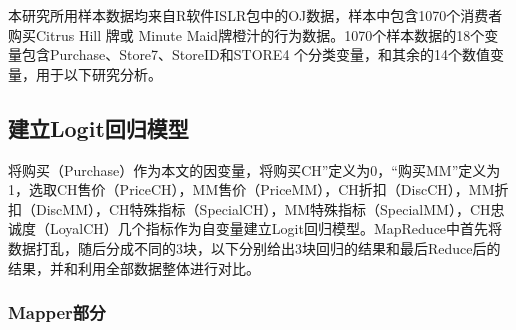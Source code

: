 本研究所用样本数据均来自R软件ISLR包中的OJ数据，样本中包含1070个消费者购买Citrus
Hill 牌或 Minute
Maid牌橙汁的行为数据。1070个样本数据的18个变量包含Purchase、Store7、StoreID和STORE4
个分类变量，和其余的14个数值变量，用于以下研究分析。

\subsection{建立Logit回归模型}\label{ux5efaux7acblogitux56deux5f52ux6a21ux578b}

将购买（Purchase）作为本文的因变量，将购买CH''定义为0，``购买MM''定义为1，选取CH售价（PriceCH），MM售价（PriceMM），CH折扣（DiscCH），MM折扣（DiscMM），CH特殊指标（SpecialCH），MM特殊指标（SpecialMM），CH忠诚度（LoyalCH）几个指标作为自变量建立Logit回归模型。MapReduce中首先将数据打乱，随后分成不同的3块，以下分别给出3块回归的结果和最后Reduce后的结果，并和利用全部数据整体进行对比。

\subsubsection{Mapper部分}\label{mapperux90e8ux5206}

